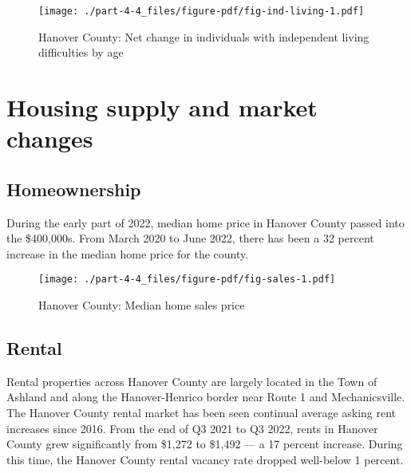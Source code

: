 \documentclass[
  letterpaper,
  DIV=11,
  numbers=noendperiod]{scrreprt}
\begin{document}
\begin{figure}

{\centering \texttt{[image: ./part-4-4\_files/figure-pdf/fig-ind-living-1.pdf]}

}

\caption{\label{fig-ind-living}Hanover County: Net change in individuals
with independent living difficulties by age}

\end{figure}

\hypertarget{housing-supply-and-market-changes-3}{%
\section{Housing supply and market
changes}\label{housing-supply-and-market-changes-3}}

\hypertarget{homeownership-3}{%
\subsection{Homeownership}\label{homeownership-3}}

During the early part of 2022, median home price in Hanover County
passed into the \$400,000s. From March 2020 to June 2022, there has been
a 32 percent increase in the median home price for the county.

\begin{figure}

{\centering \texttt{[image: ./part-4-4\_files/figure-pdf/fig-sales-1.pdf]}

}

\caption{\label{fig-sales}Hanover County: Median home sales price}

\end{figure}

\hypertarget{rental-3}{%
\subsection{Rental}\label{rental-3}}

Rental properties across Hanover County are largely located in the Town
of Ashland and along the Hanover-Henrico border near Route 1 and
Mechanicsville. The Hanover County rental market has been seen continual
average asking rent increases since 2016. From the end of Q3 2021 to Q3
2022, rents in Hanover County grew significantly from \$1,272 to \$1,492
--- a 17 percent increase. During this time, the Hanover County rental
vacancy rate dropped well-below 1 percent.
\end{document}
